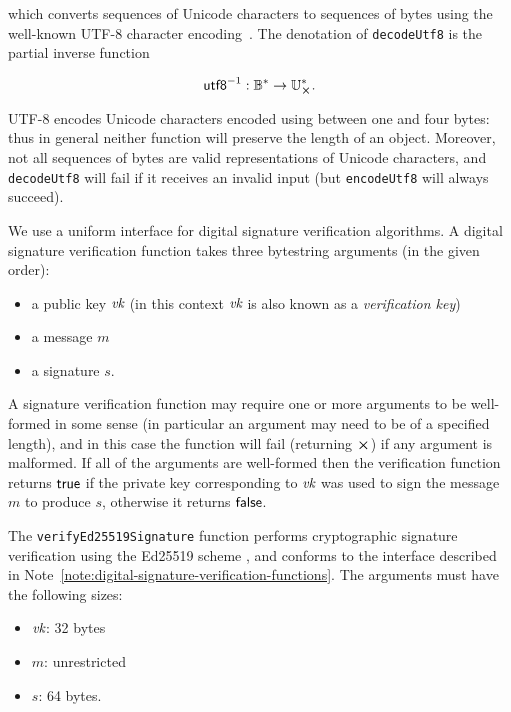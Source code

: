 \noindent which converts sequences of Unicode characters to sequences of bytes using the
well-known UTF-8 character encoding~\cite[Definition  D92]{Unicode-standard}.
The denotation of \texttt{decodeUtf8} is the partial inverse function

$$
\unutfeight: \B^* \rightarrow \U^*_{\errorX}.
$$

\noindent UTF-8 encodes Unicode characters encoded using between one and four
bytes: thus in general neither function will preserve the length of an object.
Moreover, not all sequences of bytes are valid representations of Unicode
characters, and \texttt{decodeUtf8} will fail if it receives an invalid input
(but \texttt{encodeUtf8} will always succeed).




\label{note:digital-signature-verification-functions}
We use a uniform interface for digital signature verification algorithms. A
digital signature verification function takes three bytestring arguments (in the
given order):
\begin{itemize}
  \item a public key $\textit{vk}$ (in this context $\textit{vk}$ is also known as a \textit{verification key}) 
  \item a message $m$
  \item a signature  $s$.
\end{itemize}
\noindent A signature verification function may require one
or more arguments to be well-formed in some sense (in particular an argument
may need to be of a specified length), and in this case the function will fail
(returning $\errorX$) if any argument is malformed. If all of the arguments are
well-formed then the verification function returns $\mathsf{true}$ if the private
key corresponding to $\textit{vk}$ was used to sign the message $m$ to produce $s$,
otherwise it returns $\mathsf{false}$.

\label{note:ed25519-signature-verification}
The \texttt{verifyEd25519Signature}
function performs cryptographic
signature verification using the Ed25519 scheme \cite{ches-2011-24091,
  rfc8032-EdDSA}, and conforms to the interface described in
Note~\ref{note:digital-signature-verification-functions}.  The arguments must
have the following sizes:
\begin{itemize}
\item $\textit{vk}$: 32 bytes
\item $m$: unrestricted
\item $s$: 64 bytes.
\end{itemize}



